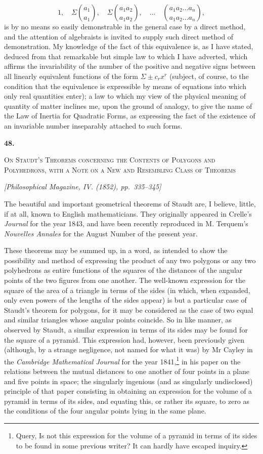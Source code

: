\documentclass[11pt]{article}
\newcommand{\paperhead}[3]{%
  \clearpage
  \begin{center}
  {\Large\bfseries #1.}\par\vspace{0.85em}
  {\large\scshape #2}\par\vspace{0.6em}
  {\itshape [#3]}\par
  \end{center}\vspace{0.4em}}
\newcommand{\sourcepage}[1]{\marginpar{\scriptsize p.~#1}}
\begin{document}
{{\[
1,\quad \Sigma\binom{a_1}{a_1},\quad
\Sigma\binom{a_1a_2}{a_1a_2},\quad\ldots\quad
\binom{a_1a_2\ldots a_n}{a_1a_2\ldots a_n},
\]
is by no means so easily demonstrable in the general case by a direct method, and the attention of algebraists is invited to supply such direct method of demonstration. My knowledge of the fact of this equivalence is, as I have stated, deduced from that remarkable but simple law to which I have adverted, which affirms the invariability of the number of the positive and negative signs between all linearly equivalent functions of the form $\Sigma\pm c_r x^r$ (subject, of course, to the condition that the equivalence is expressible by means of equations into which only real quantities enter); a law to which my view of the physical meaning of quantity of matter inclines me, upon the ground of analogy, to give the name of the Law of Inertia for Quadratic Forms, as expressing the fact of the existence of an invariable number inseparably attached to such forms.

\paperhead{48}{On Staudt's Theorems concerning the Contents of Polygons and Polyhedrons, with a Note on a New and Resembling Class of Theorems}{Philosophical Magazine, IV. (1852), pp.~335--345}

\sourcepage{382}
The beautiful and important geometrical theorems of Staudt are, I believe, little, if at all, known to English mathematicians. They originally appeared in Crelle's \emph{Journal} for the year 1843, and have been recently reproduced in M. Terquem's \emph{Nouvelles Annales} for the August Number of the present year.

These theorems may be summed up, in a word, as intended to show the possibility and method of expressing the product of any two polygons or any two polyhedrons as entire functions of the squares of the distances of the angular points of the two figures from one another. The well-known expression for the square of the area of a triangle in terms of the sides (in which, when expanded, only even powers of the lengths of the sides appear) is but a particular case of Staudt's theorem for polygons, for it may be considered as the case of two equal and similar triangles whose angular points coincide. So in like manner, as observed by Staudt, a similar expression in terms of its sides may be found for the square of a pyramid. This expression had, however, been previously given (although, by a strange negligence, not named for what it was) by Mr Cayley in the \emph{Cambridge Mathematical Journal} for the year 1841,\footnote{Query, Is not this expression for the volume of a pyramid in terms of its sides to be found in some previous writer? It can hardly have escaped inquiry.} in his paper on the relations between the mutual distances to one another of four points in a plane and five points in space; the singularly ingenious (and as singularly undisclosed) principle of that paper consisting in obtaining an expression for the volume of a pyramid in terms of its sides, and equating this, or rather its square, to zero as the conditions of the four angular points lying in the same plane.

}}
\end{document}
